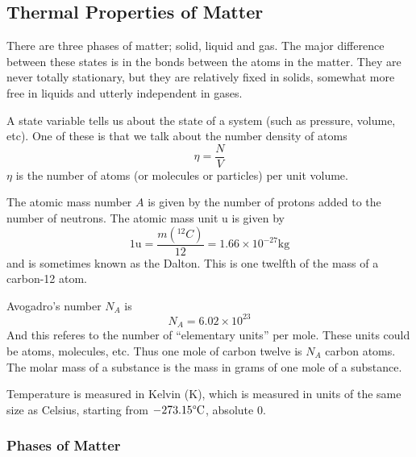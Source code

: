 \documentclass[12pt]{report}
\begin{document}
\begin{flushleft}
\subsection*{Thermal Properties of Matter}

There are three phases of matter; solid, liquid and gas. The major difference
between these states is in the bonds between the atoms in the matter. They are
never totally stationary, but they are relatively fixed in solids, somewhat
more free in liquids and utterly independent in gases. \par
A state variable tells us about the state of a system (such as pressure,
volume, etc). One of these is that we talk about the number density of atoms
\[\eta = \frac{N}{V}\]
\(\eta\) is the number of atoms (or molecules or particles) per unit volume.
\par
The atomic mass number \(A\) is given by the number of protons added to the
number of neutrons. The atomic mass unit \(\mathrm{u}\) is given by
\[1\mathrm{u} = \frac{m\left(^{12}C\right)}{12}
= 1.66\times10^{-27}\mathrm{kg}\]
and is sometimes known as the Dalton. This is one twelfth of the mass of a
carbon-12 atom. \par
Avogadro's number \(N_A\) is
\[N_A = 6.02\times10^{23}\]
And this referes to the number of ``elementary units'' per mole. These units
could be atoms, molecules, etc. Thus one mole of carbon twelve is \(N_A\)
carbon atoms. The molar mass of a substance is the mass in grams of one mole of
a substance. \par
Temperature is measured in Kelvin (\(\mathrm{K}\)), which is measured in units
of the same size as Celsius, starting from \(-273.15\degree\mathrm{C}\),
absolute \(0\). \par

\subsubsection*{Phases of Matter}


\end{flushleft}
\end{document}
